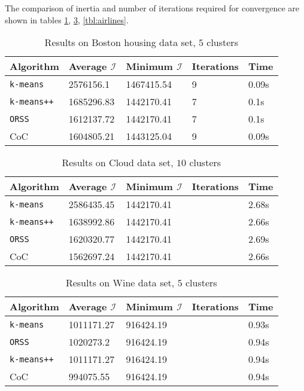 \documentclass[twoside, 11pt]{article}
\newcommand{\I}{\mathcal{I}}
\begin{document}
	The comparison of inertia and number of iterations required for convergence are shown in tables \ref{tbl:boston}, \ref{tbl:wine}, \ref{tbl:airlines}. 
		\begin{table}
			\begin{center}
				\begin{tabular}{|l|l|l|l|l|}
					\hline
					Algorithm & Average $\I$& Minimum $\I$& Iterations & Time\\\hline
					\texttt{k-means} & 2576156.1& 1467415.54& 9& 0.09s\\\hline
					\texttt{k-means++} & 1685296.83& 1442170.41& 7& 0.1s\\\hline
					\texttt{ORSS} & 1612137.72& 1442170.41& 7& 0.1s\\\hline
					CoC & 1604805.21& 1443125.04& 9& 0.09s\\\hline
				\end{tabular}
			\caption{Results on Boston housing data set, $5$ clusters}
			\label{tbl:boston}
			\end{center}
		\end{table}
	
		\begin{table}
			\begin{center}
				\begin{tabular}{|l|l|l|l|l|}
					\hline
					Algorithm & Average $\I$& Minimum $\I$& Iterations & Time\\\hline
					\texttt{k-means} & 2586435.45& 1442170.41& & 2.68s\\\hline
					\texttt{k-means++} & 1638992.86& 1442170.41& & 2.66s\\\hline
					\texttt{ORSS} & 1620320.77& 1442170.41& & 2.69s\\\hline
					CoC & 1562697.24& 1442170.41& & 2.66s\\\hline
				\end{tabular}
				\caption{Results on Cloud data set, $10$ clusters}
				\label{tbl:cloud}
			\end{center}
		\end{table}
	
		\begin{table}
			\begin{center}
				\begin{tabular}{|l|l|l|l|l|}
					\hline
					Algorithm & Average $\I$& Minimum $\I$& Iterations & Time\\\hline
					\texttt{k-means} & 1011171.27& 916424.19& & 0.93s\\\hline
					\texttt{ORSS} & 1020273.2& 916424.19& & 0.94s\\\hline
					\texttt{k-means++} & 1011171.27& 916424.19& & 0.94s\\\hline
					CoC & 994075.55& 916424.19& & 0.94s\\\hline
				\end{tabular}
				\caption{Results on Wine data set, $5$ clusters}
				\label{tbl:wine}
			\end{center}
			
		\end{table}
\end{document}
